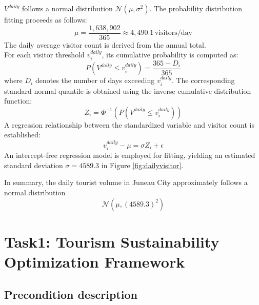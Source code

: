 \documentclass{mcmthesis}
\begin{document}
\begin{itemize}
  $V^{daily}$ follows a normal distribution $\mathcal{N}(\mu, \sigma^2)$. The probability distribution fitting proceeds as follows:
  $$\mu = \frac{1{,}638{,}902}{365} \approx 4{,}490.1 \, \text{visitors/day}$$
  The daily average visitor count is derived from the annual total.\\
  For each visitor threshold $v^{daily}_i$, its cumulative probability is computed as:
  $$P(V^{daily} \leq v^{daily}_i) = \frac{365 - D_i}{365}$$
  where $D_i$ denotes the number of days exceeding $v^{daily}_i$. The corresponding standard normal quantile is obtained using the inverse cumulative distribution function:
  $$Z_i = \Phi^{-1} \left( P(V^{daily} \leq v^{daily}_i) \right)$$
  A regression relationship between the standardized variable and visitor count is established:
  $$v^{daily}_i - \mu = \sigma Z_i + \epsilon$$
  An intercept-free regression model is employed for fitting, yielding an estimated standard deviation $\sigma = 4589.3$ in Figure \ref{fig:dailyvisitor}.\par
  In summary, the daily tourist volume in Juneau City approximately follows a normal distribution 
  \begin{equation}
    \label{eq:dailyvisitor}
    \mathcal{N}(\mu, (4589.3)^2)
  \end{equation}
  
  
\end{itemize}




  
\section{Task1: Tourism Sustainability Optimization Framework}
\subsection{Precondition description}
\end{document}
